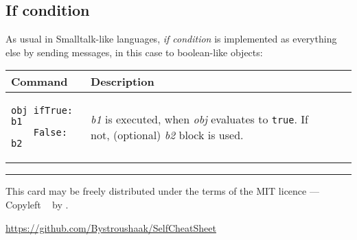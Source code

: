 \documentclass[10pt]{article}
\begin{document}
\begin{multicols*}{3}
\subsection{If condition}

As usual in Smalltalk-like languages, \textit{if condition} is implemented as everything else by sending messages, in this case to boolean-like objects:

\vspace*{0.2cm}
\begin{tabular}{ p{3.4cm} p{4cm} l l }
Command & Description \\ \hline
\begin{verbatim}
obj ifTrue: b1
    False: b2
\end{verbatim}
& \textit{b1} is executed, when \textit{obj} evaluates to \texttt{true}.
If not, (optional) \textit{b2} block is used. \\
\hline


\end{tabular}





\vfill \hrule\smallskip
{\small This card may be freely distributed under
the terms of the MIT licence ---
Copyleft \textcopyleft\ \thedate{} by \theauthor{}.}

\url{https://github.com/Bystroushaak/SelfCheatSheet}

\end{multicols*}
\end{document}
